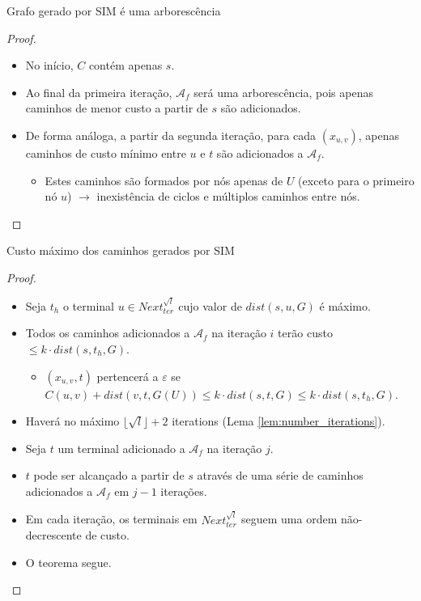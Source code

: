 \documentclass[10pt]{beamer}
\begin{document}
\begin{frame}{Grafo gerado por SIM é uma arborescência \hyperlink{sim_output_arborescence}{}}
 \hypertarget{sim_output_arborescence_slide}{}
  \begin{proof}%
    \begin{itemize}
      \item <2-> No início, $C$ contém apenas $s$.
      \item <3-> Ao final da primeira iteração, $\mathcal{A}_f$ será uma arborescência, pois apenas caminhos de menor custo a partir de $s$ são adicionados.
      \item <4-> De forma análoga, a partir da segunda iteração, para cada $(x_{u,v})$, apenas caminhos de custo mínimo entre $u$ e $t$ são adicionados a $\mathcal{A}_f$.
      \begin{itemize}
	\item <5-> Estes caminhos são formados por nós apenas de $U$ (exceto para o primeiro nó $u$) $\rightarrow$ inexistência de ciclos e múltiplos caminhos entre nós.
      \end{itemize}
    \end{itemize}
  \end{proof}
\end{frame}

\begin{frame}{Custo máximo dos caminhos gerados por SIM \hyperlink{cost}{}}
\hypertarget{cost_slide}{}
  \begin{proof}%
    \begin{itemize}
      \item <1-> Seja $t_h$ o terminal $u \in Next^{\sqrt{l}}_{ter}$ cujo valor de $dist(s,u,G)$ é máximo.
      \item <2-> Todos os caminhos adicionados a $\mathcal{A}_f$ na iteração $i$ terão custo $\le k \cdot dist(s,t_h,G)$.
      \begin{itemize}
	\item <3-> $(x_{u,v},t)$ pertencerá a $\varepsilon$ se $C(u,v)+dist(v,t,G(U)) \le k \cdot dist(s,t,G) \le k \cdot dist(s,t_h,G)$.
      \end{itemize}
      \item <4-> Haverá no máximo $\lfloor\sqrt{l}\rfloor+2$ iterations (Lema \ref{lem:number_iterations}).
      \item <5-> Seja $t$ um terminal adicionado a $\mathcal{A}_f$ na iteração $j$.
      \item <6-> $t$ pode ser alcançado a partir de $s$ através de uma série de caminhos adicionados a $\mathcal{A}_f$ em $j-1$ iterações.
      \item <7-> Em cada iteração, os terminais em $Next^{\sqrt{l}}_{ter}$ seguem uma ordem não-decrescente de custo.
      \item <8-> O teorema segue.
    \end{itemize}
  \end{proof}
\end{frame}
\end{document}
